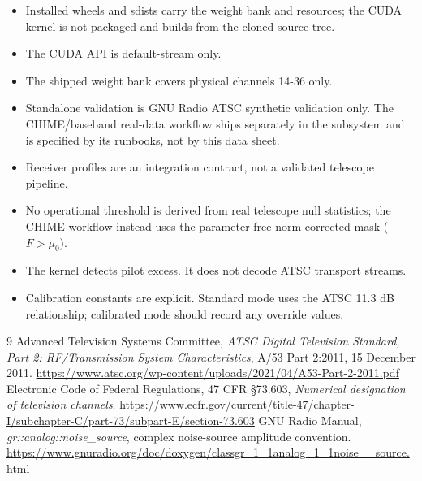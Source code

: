 \documentclass[10pt,letterpaper]{article}
\newcommand{\code}[1]{\texttt{\detokenize{#1}}}
\begin{document}
\begin{itemize}
  \item Installed wheels and sdists carry the weight bank and \code{configs/} resources; the CUDA kernel is not packaged and builds from the cloned source tree.
  \item The CUDA API is default-stream only.
  \item The shipped weight bank covers physical channels 14-36 only.
  \item Standalone validation is GNU Radio ATSC synthetic validation only.  The CHIME/baseband real-data workflow ships separately in the \code{pilot_proxy.chime} subsystem and is specified by its runbooks, not by this data sheet.
  \item Receiver profiles are an integration contract, not a validated telescope pipeline.
  \item No operational threshold is derived from real telescope null statistics; the CHIME workflow instead uses the parameter-free norm-corrected mask ($F>\mu_0$).
  \item The kernel detects pilot excess.  It does not decode ATSC transport streams.
  \item Calibration constants are explicit.  Standard mode uses the ATSC 11.3 dB relationship; calibrated mode should record any override values.
\end{itemize}

\begin{thebibliography}{9}
 Advanced Television Systems Committee, \emph{ATSC Digital Television Standard, Part 2: RF/Transmission System Characteristics}, A/53 Part 2:2011, 15 December 2011. \url{https://www.atsc.org/wp-content/uploads/2021/04/A53-Part-2-2011.pdf}
 Electronic Code of Federal Regulations, 47 CFR \S 73.603, \emph{Numerical designation of television channels}. \url{https://www.ecfr.gov/current/title-47/chapter-I/subchapter-C/part-73/subpart-E/section-73.603}
 GNU Radio Manual, \emph{gr::analog::noise\_source}, complex noise-source amplitude convention. \url{https://www.gnuradio.org/doc/doxygen/classgr_1_1analog_1_1noise__source.html}
\end{thebibliography}
\end{document}
